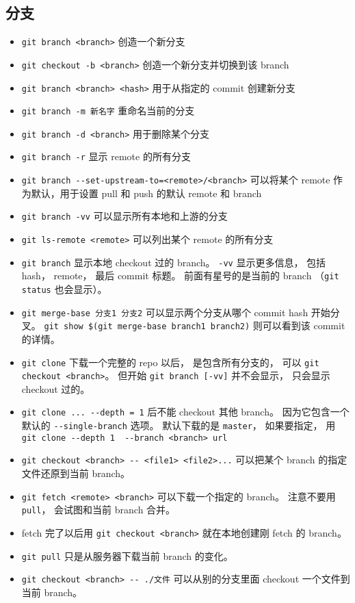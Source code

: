 \subsection{分支}
\begin{itemize}
\item \verb`git branch <branch>` 创造一个新分支
\item \verb`git checkout -b <branch>` 创造一个新分支并切换到该 branch
\item \verb`git branch <branch> <hash>` 用于从指定的 commit 创建新分支
\item \verb`git branch -m 新名字` 重命名当前的分支
\item \verb`git branch -d <branch>` 用于删除某个分支
\item \verb`git branch -r` 显示 remote 的所有分支
\item \verb`git branch --set-upstream-to=<remote>/<branch>` 可以将某个 remote 作为默认，用于设置 pull 和 push 的默认 remote 和 branch
\item \verb`git branch -vv` 可以显示所有本地和上游的分支
\item \verb`git ls-remote <remote>` 可以列出某个 remote 的所有分支
\item \verb`git branch` 显示本地 checkout 过的 branch。 \verb`-vv` 显示更多信息， 包括 hash， remote， 最后 commit 标题。 前面有星号的是当前的 branch （\verb`git status` 也会显示）。
\item \verb`git merge-base 分支1 分支2` 可以显示两个分支从哪个 commit hash 开始分叉。 \verb`git show $(git merge-base branch1 branch2)` 则可以看到该 commit 的详情。
\item \verb`git clone` 下载一个完整的 repo 以后， 是包含所有分支的， 可以 \verb`git checkout <branch>`。 但开始 \verb`git branch [-vv]` 并不会显示， 只会显示 checkout 过的。
\item \verb`git clone ... --depth = 1` 后不能 checkout 其他 branch。 因为它包含一个默认的 \verb`--single-branch` 选项。 默认下载的是 \verb`master`， 如果要指定， 用 \verb`git clone --depth 1  --branch <branch> url`
\item \verb`git checkout <branch> -- <file1> <file2>...` 可以把某个 branch 的指定文件还原到当前 branch。
\item \verb`git fetch <remote> <branch>` 可以下载一个指定的 branch。 注意不要用 \verb`pull`， 会试图和当前 branch 合并。
\item fetch 完了以后用 \verb`git checkout <branch>` 就在本地创建刚 fetch 的 branch。
\item \verb`git pull` 只是从服务器下载当前 branch 的变化。
\item \verb`git checkout <branch> -- ./文件` 可以从别的分支里面 checkout 一个文件到当前 branch。


\end{itemize}
